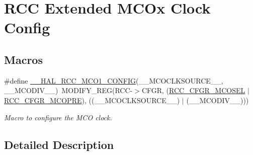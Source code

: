 \hypertarget{group___r_c_c_ex___m_c_ox___clock___config}{\section{R\-C\-C Extended M\-C\-Ox Clock Config}
\label{group___r_c_c_ex___m_c_ox___clock___config}
}
\subsection*{Macros}
\begin{DoxyCompactItemize}
\item 
\#define \hyperlink{group___r_c_c_ex___m_c_ox___clock___config_ga7e5f7f1efc92794b6f0e96068240b45e}{\-\_\-\-\_\-\-H\-A\-L\-\_\-\-R\-C\-C\-\_\-\-M\-C\-O1\-\_\-\-C\-O\-N\-F\-I\-G}(\-\_\-\-\_\-\-M\-C\-O\-C\-L\-K\-S\-O\-U\-R\-C\-E\-\_\-\-\_\-, \-\_\-\-\_\-\-M\-C\-O\-D\-I\-V\-\_\-\-\_\-)~M\-O\-D\-I\-F\-Y\-\_\-\-R\-E\-G(R\-C\-C-\/$>$C\-F\-G\-R, (\hyperlink{group___peripheral___registers___bits___definition_ga76304e842d0244575776a28f82cafcfd}{R\-C\-C\-\_\-\-C\-F\-G\-R\-\_\-\-M\-C\-O\-S\-E\-L} $\vert$ \hyperlink{group___peripheral___registers___bits___definition_ga2c2055812655d6acfda9a73dd2e94e10}{R\-C\-C\-\_\-\-C\-F\-G\-R\-\_\-\-M\-C\-O\-P\-R\-E}), ((\-\_\-\-\_\-\-M\-C\-O\-C\-L\-K\-S\-O\-U\-R\-C\-E\-\_\-\-\_\-) $\vert$ (\-\_\-\-\_\-\-M\-C\-O\-D\-I\-V\-\_\-\-\_\-)))
\begin{DoxyCompactList}\small\item\em Macro to configure the M\-C\-O clock. \end{DoxyCompactList}\end{DoxyCompactItemize}


\subsection{Detailed Description}


